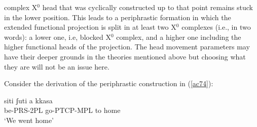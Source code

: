 \documentclass[output=paper]{langscibook}
\begin{document}
complex X$^0$ head that was cyclically constructed up to that point remains stuck in the lower position. This leads to a periphrastic formation in which the extended functional projection is split in at least two X$^0$ complexes (i.e., in two words): a lower one, i.e, blocked X$^0$ complex, and a higher one including the higher functional heads of the projection. The head movement parameters may have their deeper grounds in the theories mentioned above but choosing what they are will not be an issue here.
 
Consider the derivation of the periphrastic construction in (\ref{ac74}):

\ea \label{ac74}\gll siti    ʃuti        a   kkasa\\
   be-PRS-2PL  go-PTCP-MPL  to  home\\
   \glt ‘We went home’
\z
\end{document}
